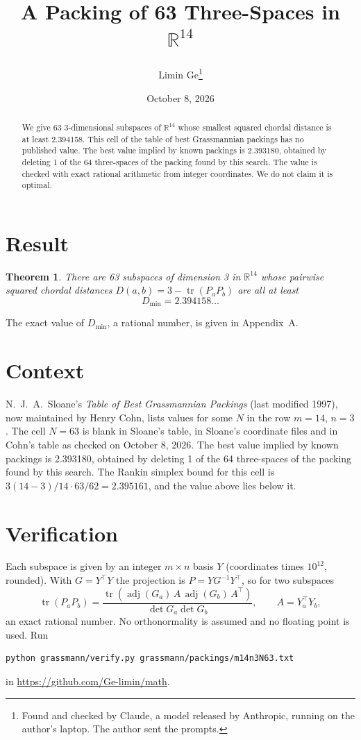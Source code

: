 \documentclass[11pt,a4paper]{article}
\title{A Packing of 63 Three-Spaces in $\mathbb{R}^{14}$}
\author{Limin Ge\thanks{Found and checked by Claude, a model released by Anthropic, running on the author's laptop. The author sent the prompts.}}
\date{October 8, 2026}
\newtheorem*{theorem}{Theorem}
\begin{document}
\maketitle
\begin{abstract}
We give 63 3-dimensional subspaces of $\mathbb{R}^{14}$ whose smallest squared chordal distance is at least 2.394158. This cell of the table of best Grassmannian packings has no published value. The best value implied by known packings is 2.393180, obtained by deleting 1 of the 64 three-spaces of the packing found by this search. The value is checked with exact rational arithmetic from integer coordinates. We do not claim it is optimal.
\end{abstract}

\section{Result}
\begin{theorem}
There are 63 subspaces of dimension 3 in $\mathbb{R}^{14}$ whose pairwise squared chordal distances $D(a,b) = 3 - \operatorname{tr}(P_aP_b)$ are all at least
\[ D_{\min} = 2.394158\ldots \]
\end{theorem}
The exact value of $D_{\min}$, a rational number, is given in Appendix~A.


\section{Context}
N.~J.~A.~Sloane's \emph{Table of Best Grassmannian Packings} (last modified 1997), now maintained by Henry Cohn, lists values for some $N$ in the row $m=14$, $n=3$. The cell $N=63$ is blank in Sloane's table, in Sloane's coordinate files and in Cohn's table as checked on October 8, 2026. The best value implied by known packings is 2.393180, obtained by deleting 1 of the 64 three-spaces of the packing found by this search. The Rankin simplex bound for this cell is $3(14-3)/14\cdot 63/62 = 2.395161$, and the value above lies below it.


\section{Verification}
Each subspace is given by an integer $m\times n$ basis $Y$ (coordinates times $10^{12}$, rounded). With $G=Y^\top Y$ the projection is $P=YG^{-1}Y^\top$, so for two subspaces
\[ \operatorname{tr}(P_aP_b)=\frac{\operatorname{tr}(\operatorname{adj}(G_a)\,A\,\operatorname{adj}(G_b)\,A^\top)}{\det G_a\det G_b},\qquad A=Y_a^\top Y_b, \]
an exact rational number. No orthonormality is assumed and no floating point is used. Run
\begin{verbatim}
python grassmann/verify.py grassmann/packings/m14n3N63.txt
\end{verbatim}
in \url{https://github.com/Ge-limin/math}.
\end{document}
